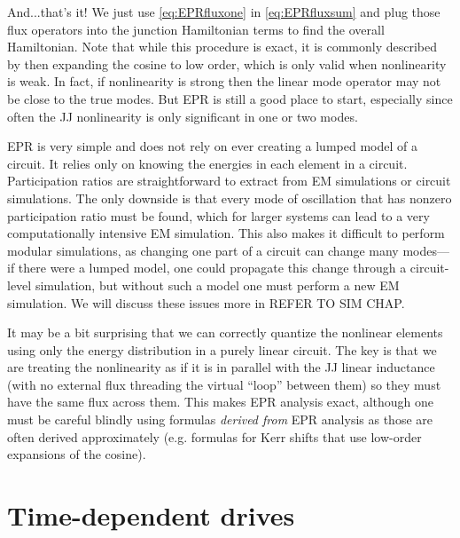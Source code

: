 And...that's it! We just use \cref{eq:EPRfluxone} in \cref{eq:EPRfluxsum} and plug those flux operators into the junction Hamiltonian terms to find the overall Hamiltonian. Note that while this procedure is exact, it is commonly described by then expanding the cosine to low order, which is only valid when nonlinearity is weak. In fact, if nonlinearity is strong then the linear mode operator may not be close to the true modes. But EPR is still a good place to start, especially since often the JJ nonlinearity is only significant in one or two modes.

EPR is very simple and does not rely on ever creating a lumped model of a circuit. It relies only on knowing the energies in each element in a circuit. Participation ratios are straightforward to extract from EM simulations or circuit simulations. The only downside is that every mode of oscillation that has nonzero participation ratio must be found, which for larger systems can lead to a very computationally intensive EM simulation. This also makes it difficult to perform modular simulations, as changing one part of a circuit can change many modes---if there were a lumped model, one could propagate this change through a circuit-level simulation, but without such a model one must perform a new EM simulation. We will discuss these issues more in REFER TO SIM CHAP.

It may be a bit surprising that we can correctly quantize the nonlinear elements using only the energy distribution in a purely linear circuit. The key is that we are treating the nonlinearity as if it is in parallel with the JJ linear inductance (with no external flux threading the virtual ``loop'' between them) so they must have the same flux across them. This makes EPR analysis exact, although one must be careful blindly using formulas \textit{derived from} EPR analysis as those are often derived approximately (e.g. formulas for Kerr shifts that use low-order expansions of the cosine). 

\section{Time-dependent drives}

